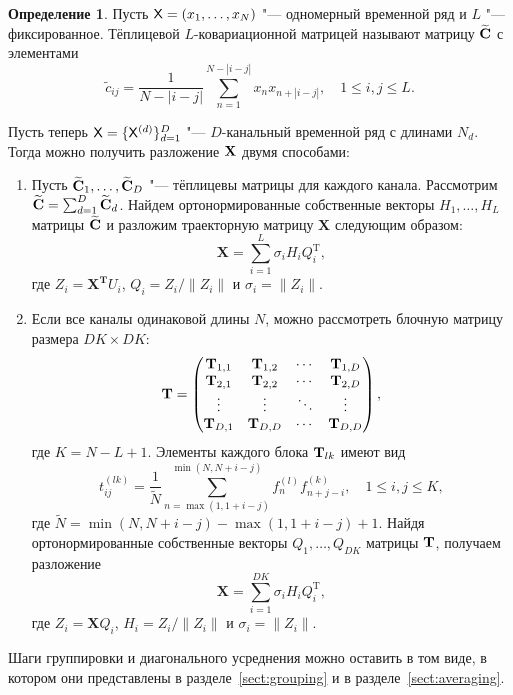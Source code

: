 \documentclass[specialist,
substylefile = spbu_report.rtx,
subf,href,colorlinks=true, 12pt]{disser}
\newcommand{\traj}{\mathbf{X}}
\theoremstyle{definition}
\newtheorem{definition}{Определение}
\begin{document}
	\begin{definition}
	Пусть $\mathsf{X}=(x_1,\ldots,x_N)$ "--- одномерный временной ряд и $L$ "--- фиксированное. Тёплицевой $L$-ковариационной матрицей называют матрицу $\widetilde{\mathbf{C}}$ с элементами
	\[
	\widetilde{c}_{ij}=\frac{1}{N-|i-j|}\sum_{n=1}^{N-|i-j|} x_nx_{n+|i-j|},\quad 1\leqslant i,j \leqslant L.
	\]
	\end{definition}
	
	Пусть теперь $\mathsf{X}=\{\mathsf{X}^{(d)}\}_{d=1}^D$ "--- $D$-канальный временной ряд с длинами $N_d$. Тогда можно получить разложение $\mathbf{X}$ двумя способами:
	\begin{enumerate}
		\item Пусть $\widetilde{\mathbf{C}}_1,\ldots,\widetilde{\mathbf{C}}_D$ "--- тёплицевы матрицы для каждого канала. Рассмотрим $\widetilde{\mathbf{C}}=\sum_{d=1}^D \widetilde{\mathbf{C}}_d$. Найдем ортонормированные собственные векторы $H_1,\ldots,H_L$ матрицы $\widetilde{\mathbf{C}}$ и разложим траекторную матрицу $\traj$ следующим образом:
		\begin{equation}\label{eq:sum_decomposition}
			\mathbf{X}=\sum_{i=1}^L \sigma_i H_i Q_i^\mathrm{T},
		\end{equation}
		где $Z_i=\mathbf{X^T}U_i$, $Q_i=Z_i/\|Z_i\|$ и $\sigma_i=\|Z_i\|$.
		\item Если все каналы одинаковой длины $N$, можно рассмотреть блочную матрицу размера $DK\times DK$:
		\[
		\mathbf{T}=\begin{pmatrix}
			\mathbf{T}_{1,1} & \mathbf{T}_{1,2} & \cdots & \mathbf{T}_{1,D} \\
			\mathbf{T}_{2,1} & \mathbf{T}_{2,2} & \cdots & \mathbf{T}_{2,D} \\
			\vdots  & \vdots  & \ddots & \vdots  \\
			\mathbf{T}_{D,1} & \mathbf{T}_{D,D} & \cdots & \mathbf{T}_{D,D}
		\end{pmatrix},
		\]
		где $K=N-L+1$.
		Элементы каждого блока $\mathbf{T}_{lk}$ имеют вид
		\[
		t^{(lk)}_{ij}=\frac{1}{\tilde N}\sum_{n=\max(1,1+i-j)}^{\min(N,N+i-j)} f^{(l)}_nf^{(k)}_{n+j-i},\quad 1\leqslant i,j\leqslant K,
		\]
		где $\tilde N=\min(N,N+i-j)-\max(1,1+i-j)+1$. Найдя ортонормированные собственные векторы $Q_1,\ldots,Q_{DK}$ матрицы $\mathbf{T}$, получаем разложение
		\begin{equation}\label{eq:block_decomposition}
			\mathbf{X}=\sum_{i=1}^{DK} \sigma_i H_i Q_i^\mathrm{T},    
		\end{equation}
		где $Z_i=\mathbf{X}Q_i$, $H_i=Z_i/\|Z_i\|$ и $\sigma_i=\|Z_i\|$.
	\end{enumerate}
	Шаги группировки и диагонального усреднения можно оставить в том виде, в котором они представлены в разделе~\ref{sect:grouping} и в разделе~\ref{sect:averaging}.
	
\end{document}
